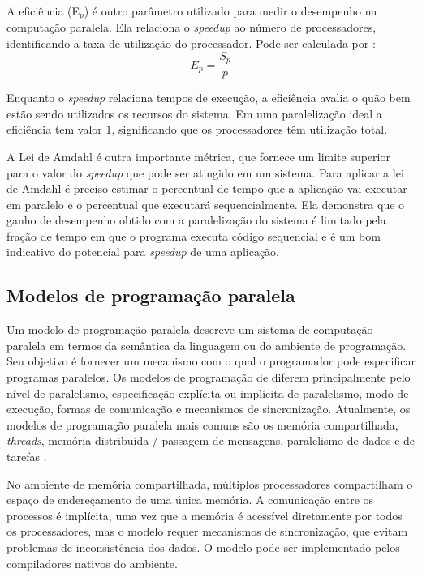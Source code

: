 A eficiência (E$_p$) é outro parâmetro utilizado para medir o desempenho na computação paralela.  Ela relaciona o \textit{speedup} ao número de processadores, identificando a taxa de utilização do processador. Pode ser calculada por \cite{Rauber:2010}: 
 \[ E_p = \frac{S_p}{p} \]
 
Enquanto o \textit{speedup} relaciona tempos de execução, a eficiência avalia o quão bem estão sendo utilizados os recursos do sistema. Em uma paralelização ideal a eficiência tem valor 1, significando que os processadores têm utilização total.
		
A Lei de Amdahl  é outra importante métrica, que fornece um limite superior para o valor do \textit{speedup} que pode ser atingido em um sistema. Para aplicar a lei de Amdahl é preciso estimar o percentual de tempo que a aplicação vai executar em paralelo e   o percentual que executará sequencialmente. 
Ela demonstra que o ganho de desempenho obtido com a paralelização do sistema é limitado pela fração de tempo em que o programa executa código sequencial e é um bom indicativo do potencial para \textit{speedup} de uma aplicação.


\subsection{Modelos de programação paralela}

Um modelo de programação paralela descreve um sistema de computação paralela em termos da semântica da linguagem ou do ambiente de programação. Seu objetivo é fornecer um mecanismo com o qual o programador pode especificar programas paralelos. Os modelos de programação de diferem principalmente pelo nível de paralelismo, especificação explícita ou implícita de paralelismo, modo de execução, formas de comunicação e mecanismos de sincronização. Atualmente, os modelos de programação paralela mais comuns são os memória compartilhada, \textit{threads}, memória distribuída / passagem de mensagens, paralelismo de dados e de tarefas \cite{Rauber:2010}.
 


No ambiente de memória compartilhada, múltiplos processadores compartilham o espaço de endereçamento de uma única memória. A comunicação entre os processos é implícita, uma vez que a memória é acessível diretamente por todos os processadores, mas o modelo requer mecanismos de sincronização, que evitam problemas de inconsistência dos dados. O modelo pode ser implementado pelos compiladores nativos do ambiente.

